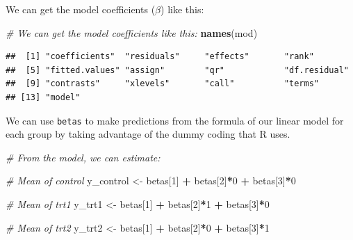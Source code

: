 \documentclass[
]{book}
\newenvironment{Shaded}{\begin{snugshade}}{\end{snugshade}}
\newcommand{\CommentTok}[1]{\textcolor[rgb]{0.56,0.35,0.01}{\textit{#1}}}
\newcommand{\DecValTok}[1]{\textcolor[rgb]{0.00,0.00,0.81}{#1}}
\newcommand{\KeywordTok}[1]{\textcolor[rgb]{0.13,0.29,0.53}{\textbf{#1}}}
\newcommand{\NormalTok}[1]{#1}
\newcommand{\OperatorTok}[1]{\textcolor[rgb]{0.81,0.36,0.00}{\textbf{#1}}}
\newcommand{\StringTok}[1]{\textcolor[rgb]{0.31,0.60,0.02}{#1}}
\begin{document}
We can get the model coefficients (\(\beta\)) like this:

\begin{Shaded}
\begin{Highlighting}[]
\CommentTok{# We can get the model coefficients like this:}
\KeywordTok{names}\NormalTok{(mod)}
\end{Highlighting}
\end{Shaded}

\begin{verbatim}
##  [1] "coefficients"  "residuals"     "effects"       "rank"         
##  [5] "fitted.values" "assign"        "qr"            "df.residual"  
##  [9] "contrasts"     "xlevels"       "call"          "terms"        
## [13] "model"
\end{verbatim}

\begin{Shaded}
\end{Shaded}

We can use \texttt{betas} to make predictions from the formula of our linear model for each group by taking advantage of the dummy coding that R uses.

\begin{Shaded}
\begin{Highlighting}[]
\CommentTok{# From the model, we can estimate:}

\CommentTok{# Mean of control}
\NormalTok{y_control <-}\StringTok{ }\NormalTok{betas[}\DecValTok{1}\NormalTok{] }\OperatorTok{+}\StringTok{ }\NormalTok{betas[}\DecValTok{2}\NormalTok{]}\OperatorTok{*}\DecValTok{0} \OperatorTok{+}\StringTok{ }\NormalTok{betas[}\DecValTok{3}\NormalTok{]}\OperatorTok{*}\DecValTok{0}

\CommentTok{# Mean of trt1}
\NormalTok{y_trt1 <-}\StringTok{ }\NormalTok{betas[}\DecValTok{1}\NormalTok{] }\OperatorTok{+}\StringTok{ }\NormalTok{betas[}\DecValTok{2}\NormalTok{]}\OperatorTok{*}\DecValTok{1} \OperatorTok{+}\StringTok{ }\NormalTok{betas[}\DecValTok{3}\NormalTok{]}\OperatorTok{*}\DecValTok{0}

\CommentTok{# Mean of trt2}
\NormalTok{y_trt2 <-}\StringTok{ }\NormalTok{betas[}\DecValTok{1}\NormalTok{] }\OperatorTok{+}\StringTok{ }\NormalTok{betas[}\DecValTok{2}\NormalTok{]}\OperatorTok{*}\DecValTok{0} \OperatorTok{+}\StringTok{ }\NormalTok{betas[}\DecValTok{3}\NormalTok{]}\OperatorTok{*}\DecValTok{1}
\end{Highlighting}
\end{Shaded}
\end{document}
